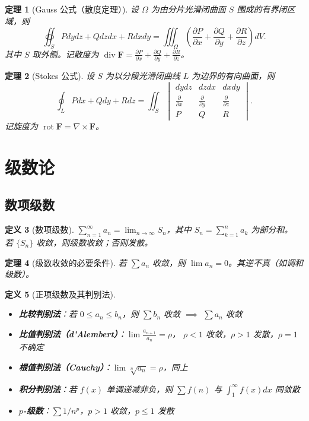 \documentclass[12pt,a4paper]{ctexart}
\newtheorem{theorem}{定理}[section]
\newtheorem{definition}[theorem]{定义}
\theoremstyle{remark}
\begin{document}
\begin{theorem}[Gauss 公式（散度定理）]
设 $\Omega$ 为由分片光滑闭曲面 $S$ 围成的有界闭区域，则
\[
\oiint_S P dydz + Q dzdx + R dxdy = \iiint_\Omega
\left(\frac{\partial P}{\partial x} + \frac{\partial Q}{\partial y} + \frac{\partial R}{\partial z}\right) dV.
\]
其中 $S$ 取外侧。记散度为 $\operatorname{div} \mathbf{F} = \frac{\partial P}{\partial x} + \frac{\partial Q}{\partial y} + \frac{\partial R}{\partial z}$。
\end{theorem}

\begin{theorem}[Stokes 公式]
设 $S$ 为以分段光滑闭曲线 $L$ 为边界的有向曲面，则
\[
\oint_L Pdx+Qdy+Rdz = \iint_S
\begin{vmatrix}
dydz & dzdx & dxdy \\
\frac{\partial}{\partial x} & \frac{\partial}{\partial y} & \frac{\partial}{\partial z} \\
P & Q & R
\end{vmatrix}.
\]
记旋度为 $\operatorname{rot} \mathbf{F} = \nabla \times \mathbf{F}$。
\end{theorem}

\section{级数论}

\subsection{数项级数}

\begin{definition}[数项级数]
$\sum_{n=1}^{\infty} a_n = \lim_{n\to\infty} S_n$，其中 $S_n = \sum_{k=1}^n a_k$ 为部分和。
若 $\{S_n\}$ 收敛，则级数收敛；否则发散。
\end{definition}

\begin{theorem}[级数收敛的必要条件]
若 $\sum a_n$ 收敛，则 $\lim a_n = 0$。其逆不真（如调和级数）。
\end{theorem}

\begin{definition}[正项级数及其判别法]
\begin{itemize}
  \item \textbf{比较判别法}：若 $0 \le a_n \le b_n$，则 $\sum b_n$ 收敛 $\implies$ $\sum a_n$ 收敛
  \item \textbf{比值判别法（d'Alembert）}：$\lim \frac{a_{n+1}}{a_n} = \rho$，
    $\rho<1$ 收敛，$\rho>1$ 发散，$\rho=1$ 不确定
  \item \textbf{根值判别法（Cauchy）}：$\lim \sqrt[n]{a_n} = \rho$，同上
  \item \textbf{积分判别法}：若 $f(x)$ 单调递减非负，则 $\sum f(n)$ 与 $\int_1^{\infty} f(x)dx$ 同敛散
  \item \textbf{$p$-级数}：$\sum 1/n^p$，$p>1$ 收敛，$p\le 1$ 发散
\end{itemize}
\end{definition}
\end{document}
